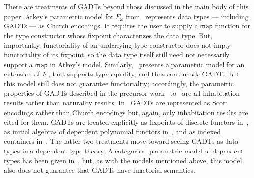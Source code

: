 \documentclass[submission,copyright,creativecommons]{eptcs}
\begin{document}
There are treatments of GADTs beyond those discussed in the main body
of this paper.  Atkey's parametric model for $F_\omega$
from~\cite{atk12} represents data types --- including GADTs --- as
Church encodings. It requires the user to supply a $\mathsf{map}$
function for the type constructor whose fixpoint characterizes the
data type. But, importantly, functoriality of an underlying type
constructor does not imply functoriality of its fixpoint, so the data
type itself still need not necessarily support a $\mathsf{map}$ in
Atkey's model. Similarly,~\cite{vw10} presents a parametric model for
an extension of $F_\omega$ that supports type equality, and thus can
encode GADTs, but this model still does not guarantee functoriality;
accordingly, the parametric properties of GADTs described in the
precursor work~\cite{vw06} to~\cite{vw10} are all inhabitation results
rather than naturality results. In~\cite{ms09} GADTs are represented
as Scott encodings rather than Church encodings but, again, only
inhabitation results are cited for them. GADTs are treated explicitly
as fixpoints of discrete functors in~\cite{jg08}, as initial algebras
of dependent polynomial functors in~\cite{gh03,hf11}, and as indexed
containers in~\cite{ma09}. The latter two treatments move toward
seeing GADTs as data types in a dependent type theory. A categorical
parametric model of dependent types has been given in~\cite{agj14},
but, as with the models mentioned above, this model also does not
guarantee that GADTs have functorial semantics.



\end{document}
